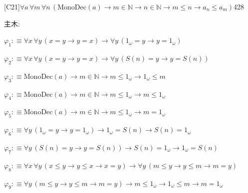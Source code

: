 \begin{fullproof}{[C21]}{$\forall a\,\forall m\,\forall n\,(\mathrm{MonoDec}(a) \to m \in \mathbb{N} \to n \in \mathbb{N} \to m \leq n \to a_{n} \leq a_{m})$}{428}
\begin{ptree}
\noLine
{}
\end{ptree}
\noindent 主木:
\begin{ptree}
\noLine
{}
\end{ptree}
\begin{abbrevlist}
\item $\varphi_{1} :\equiv \forall x\,\forall y\,(x = y \to y = x) \to \forall y\,(1_{\omega} = y \to y = 1_{\omega})$
\item $\varphi_{2} :\equiv \forall x\,\forall y\,(x = y \to y = x) \to \forall y\,(S(n) = y \to y = S(n))$
\item $\varphi_{3} :\equiv \mathrm{MonoDec}(a) \to m \in \mathbb{N} \to m \leq 1_{\omega} \to 1_{\omega} \leq m$
\item $\varphi_{4} :\equiv \mathrm{MonoDec}(a) \to m \in \mathbb{N} \to m \leq 1_{\omega} \to m \leq 1_{\omega}$
\item $\varphi_{5} :\equiv \mathrm{MonoDec}(a) \to m \in \mathbb{N} \to m \leq 1_{\omega} \to m = 1_{\omega}$
\item $\varphi_{6} :\equiv \forall y\,(1_{\omega} = y \to y = 1_{\omega}) \to 1_{\omega} = S(n) \to S(n) = 1_{\omega}$
\item $\varphi_{7} :\equiv \forall y\,(S(n) = y \to y = S(n)) \to S(n) = 1_{\omega} \to 1_{\omega} = S(n)$
\item $\varphi_{8} :\equiv \forall x\,\forall y\,(x \leq y \to y \leq x \to x = y) \to \forall y\,(m \leq y \to y \leq m \to m = y)$
\item $\varphi_{9} :\equiv \forall y\,(m \leq y \to y \leq m \to m = y) \to m \leq 1_{\omega} \to 1_{\omega} \leq m \to m = 1_{\omega}$

\end{abbrevlist}
\end{fullproof}
